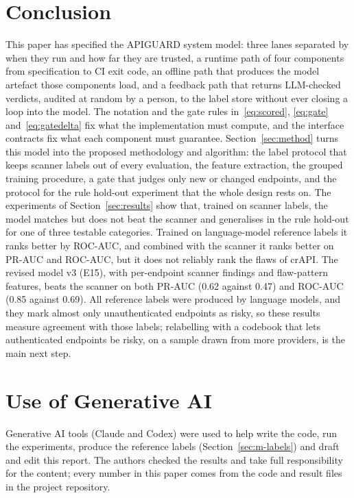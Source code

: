 \documentclass[conference]{IEEEtran}
\begin{document}
\section{Conclusion}
This paper has specified the APIGUARD system model: three lanes separated by when they
run and how far they are trusted, a runtime path of four components from specification to CI
exit code, an offline path that produces the model artefact those components load, and a
feedback path that returns LLM-checked verdicts, audited at random by a person, to the label store without ever closing a loop into
the model. The notation and the gate rules in~\eqref{eq:scored}, \eqref{eq:gate}
and~\eqref{eq:gatedelta} fix what the implementation must compute, and the interface contracts
fix what each component must guarantee. Section~\ref{sec:method} turns this model into the proposed methodology and algorithm: the label
protocol that keeps scanner labels out of every evaluation, the feature extraction, the grouped
training procedure, a gate that judges only new or changed endpoints, and the protocol for the
rule hold-out experiment that the whole design rests on. The experiments of Section~\ref{sec:results} show that, trained on scanner labels, the model matches but does not beat the scanner and generalises in the rule hold-out for one of three testable categories. Trained on language-model reference labels it ranks better by ROC-AUC, and combined with the scanner it ranks better on PR-AUC and ROC-AUC, but it does not reliably rank the flaws of crAPI. The revised model v3 (E15), with per-endpoint scanner findings and flaw-pattern features, beats the scanner on both PR-AUC (0.62 against 0.47) and ROC-AUC (0.85 against 0.69). All reference labels were produced by language models, and they mark almost only unauthenticated endpoints as risky, so these results measure agreement with those labels; relabelling with a codebook that lets authenticated endpoints be risky, on a sample drawn from more providers, is the main next step.

% 
% 

\section*{Use of Generative AI}
Generative AI tools (Claude and Codex) were used to help write the code, run the experiments, produce the reference labels (Section~\ref{sec:m-labels}) and draft and edit this report. The authors checked the results and take full responsibility for the content; every number in this paper comes from the code and result files in the project repository.
\end{document}
